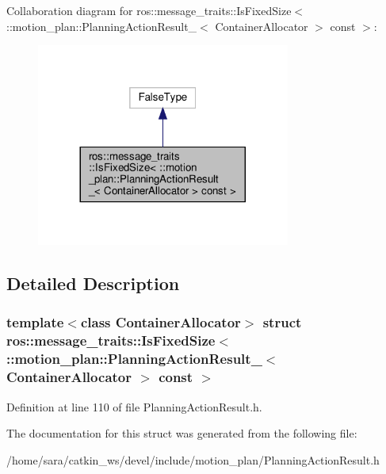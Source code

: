 Collaboration diagram for ros\+:\+:message\+\_\+traits\+:\+:Is\+Fixed\+Size$<$ \+:\+:motion\+\_\+plan\+:\+:Planning\+Action\+Result\+\_\+$<$ Container\+Allocator $>$ const $>$\+:
\nopagebreak
\begin{figure}[H]
\begin{center}
\leavevmode
\includegraphics[width=236pt]{structros_1_1message__traits_1_1IsFixedSize_3_01_1_1motion__plan_1_1PlanningActionResult___3_01C47bcaa1fa5f62926bcd3faae8b4663c0}
\end{center}
\end{figure}


\subsection{Detailed Description}
\subsubsection*{template$<$class Container\+Allocator$>$\newline
struct ros\+::message\+\_\+traits\+::\+Is\+Fixed\+Size$<$ \+::motion\+\_\+plan\+::\+Planning\+Action\+Result\+\_\+$<$ Container\+Allocator $>$ const $>$}



Definition at line 110 of file Planning\+Action\+Result.\+h.



The documentation for this struct was generated from the following file\+:\begin{DoxyCompactItemize}
\item 
/home/sara/catkin\+\_\+ws/devel/include/motion\+\_\+plan/Planning\+Action\+Result.\+h\end{DoxyCompactItemize}
